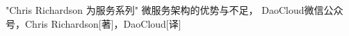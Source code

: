  \begin{thebibliography}{}
      "Chris Richardson 为服务系列" 微服务架构的优势与不足， DaoCloud微信公众号，Chris Richardson[著]，DaoCloud[译]
 \end{thebibliography}

